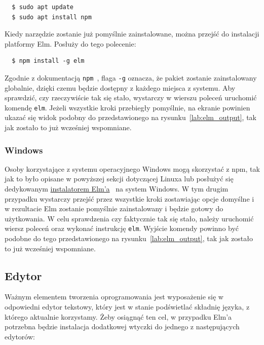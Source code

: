 \documentclass[twoside,a4paper]{report}
\begin{document}
\begin{lstlisting}
  $ sudo apt update
  $ sudo apt install npm
\end{lstlisting}

Kiedy narzędzie zostanie już pomyślnie zainstalowane, można przejść do instalacji platformy Elm.
Posłuży do tego polecenie:

\begin{lstlisting}
  $ npm install -g elm
\end{lstlisting}

Zgodnie z dokumentacją \texttt{npm}~\cite{npmdocs}, flaga \texttt{-g} oznacza, że pakiet zostanie zainstalowany globalnie, dzięki czemu będzie dostępny z każdego miejsca z systemu.
Aby sprawdzić, czy rzeczywiście tak się stało, wystarczy w wierszu poleceń uruchomić komendę \texttt{elm}.
Jeżeli wszystkie kroki przebiegły pomyślnie, na ekranie powinien ukazać się widok podobny do przedstawionego na rysunku~\ref{lab:elm_output}, tak jak zostało to już wcześniej wspomniane.

\subsubsection{Windows}
Osoby korzystające z systemu operacyjnego Windows mogą skorzystać z npm, tak jak to było opisane w powyższej sekcji dotyczącej Linuxa lub posłużyć się dedykowanym \href{https://github.com/elm/compiler/releases/download/0.19.1/installer-for-windows.exe}{instalatorem Elm'a}~\cite{elm_installer} na system Windows.
W tym drugim przypadku wystarczy przejść przez wszystkie kroki zostawiając opcje domyślne i w rezultacie Elm zostanie pomyślnie zainstalowany i będzie gotowy do użytkowania.
W celu sprawdzenia czy faktycznie tak się stało, należy uruchomić wiersz poleceń oraz wykonać instrukcję \texttt{elm}.
Wyjście komendy powinno być podobne do tego przedstawionego na rysunku~\ref{lab:elm_output}, tak jak zostało to już wcześniej wspomniane.

\subsection*{Edytor}
Ważnym elementem tworzenia oprogramowania jest wyposażenie się w odpowiedni edytor tekstowy, który jest w stanie podświetlać składnię języka, z którego aktualnie korzystamy.
Żeby osiągnąć ten cel, w przypadku Elm'a potrzebna będzie instalacja dodatkowej wtyczki do jednego z następujących edytorów:
\end{document}
